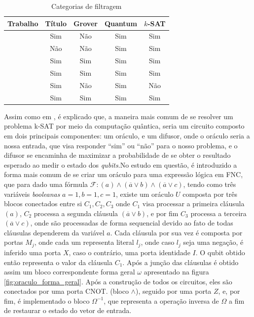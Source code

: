 \documentclass[12pt]{article}
\begin{document}
\begin{table}[h!]
\centering
\begin{tabular}{|p{5cm}|c|c|c|c|}
\hline
\textbf{Trabalho} & \textbf{Título} & \textbf{Grover} & \textbf{Quantum} & \textbf{$k$-SAT} \\
\hline
\cite{yang:23} & Sim & Não & Sim & Sim \\
\hline
\cite{parallelAndDistributed} & Não & Não & Sim & Sim \\
\hline
\cite{varmantchaonala:23} & Sim & Sim & Sim & Sim \\
\hline
\cite{wang:20} & Sim & Sim & Sim & Sim \\
\hline
\cite{mandl:24} & Sim & Não & Sim & Não\\
\hline
\cite{piro:20} & Sim & Sim & Sim & Sim\\
\hline
\end{tabular}
\caption{Categorias de filtragem}
\label{tab:trabalhos_relevantes}
\end{table}



Assim como em \cite{parallelAndDistributed}, é explicado que, a maneira mais comum de se resolver um problema k-SAT por meio da computação quântica, seria um circuito composto em dois principais componentes: um oráculo, e um difusor, onde o oráculo seria a nossa entrada, que visa responder ``sim'' ou ``não'' para o nosso problema, e o difusor se encaminha de maximizar a probabilidade de se obter o resultado esperado ao medir o estado dos \textit{qubits}.No estudo em questão, é introduzido a forma mais comum de se criar um oráculo para uma expressão lógica em FNC, que para dado uma fórmula $
\mathcal {F}: (a) \wedge (\overline{a} \vee b) \wedge (\overline{a} \vee c)
$, tendo como três variáveis \textit{booleanas} $a=1, b=1, c=1$, existe um oráculo ${U}$ composta por três blocos conectados entre si $C_1, C_2, C_3$ onde $C_1$ visa processar a primeira cláusula $(a)$, $C_2$ processa a segunda cláusula
$(\overline{a} \vee b)$, e por fim $C_3$ processa a terceira $(\overline{a} \vee c)$, onde são processadas de forma sequencial devido ao fato de todas cláusulas dependerem da variável $a$.
Cada cláusula por sua vez é composta por portas $M_j$, onde cada um representa literal $l_j$, onde caso $l_j$ seja uma negação, é inferido uma porta $X$, caso o contrário, uma porta identidade $I$. O qubit obtido então representa o valor da cláusula $C_1$. Após a junção das cláusulas é obtido assim um bloco correspondente forma geral $\omega$ apresentado na figura \ref{fig:oraculo_forma_geral}. Após a construção de todos os circuitos, eles são conectados por uma porta CNOT. (bloco $\wedge$), seguido por uma porta $Z$, e, por fim, é implementado o bloco $\Omega ^{-1}$, que representa a operação inversa de $\Omega$ a fim de restaurar o estado do vetor de entrada.
\end{document}
